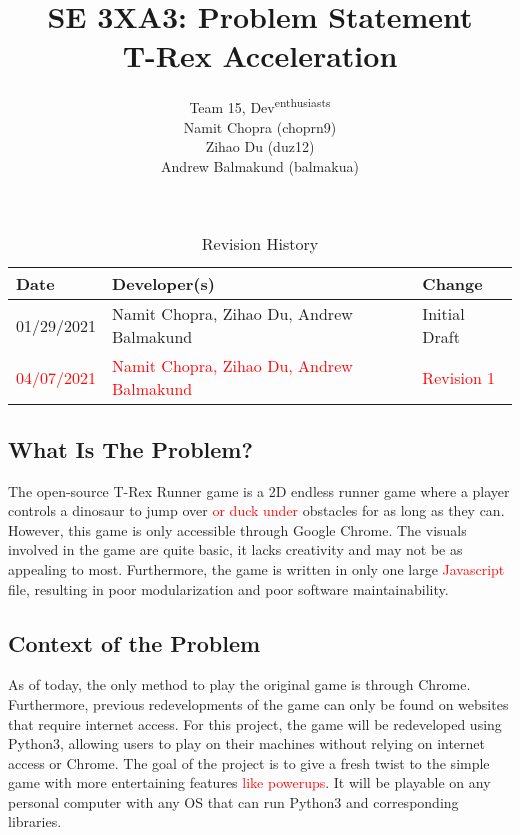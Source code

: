 \documentclass{article}
\title{SE 3XA3: Problem Statement\\T-Rex Acceleration}
\author{Team 15, Dev\textsuperscript{enthusiasts}
		\\ Namit Chopra (choprn9) 
		\\ Zihao Du (duz12)
		\\ Andrew Balmakund (balmakua)
}
\date{}
\begin{document}
\begin{table}[hp]
\caption{Revision History} \label{TblRevisionHistory}
\begin{tabularx}{\textwidth}{llX}
\toprule
\textbf{Date} & \textbf{Developer(s)} & \textbf{Change}\\
\midrule
01/29/2021 & Namit Chopra, Zihao Du, Andrew Balmakund & Initial Draft\\
\textcolor{red}{04/07/2021} & \textcolor{red}{Namit Chopra, Zihao Du, Andrew Balmakund} & \textcolor{red}{Revision 1}\\
\bottomrule
\end{tabularx}
\end{table}

\newpage

\maketitle

\subsection*{What Is The Problem?}
\qquad The open-source T-Rex Runner game is a 2D endless runner game where a player controls a dinosaur to jump over \textcolor{red}{or duck under} obstacles for as long as they can. However, this game is only accessible through Google Chrome. The visuals involved in the game are quite basic, it lacks creativity and may not be as appealing to most. Furthermore, the game is written in only one large \textcolor{red}{Javascript} file, resulting in poor modularization and poor software maintainability.

\subsection*{Context of the Problem}
\qquad As of today, the only method to play the original game is through Chrome. Furthermore, previous redevelopments of the game can only be found on websites that require internet access. For this project, the game will be redeveloped using Python3, allowing users to play on their machines without relying on internet access or Chrome. The goal of the project is to give a fresh twist to the simple game with more entertaining features \textcolor{red}{like powerups}. It will be playable on any personal computer with any OS that can run Python3 and corresponding libraries.
\end{document}
